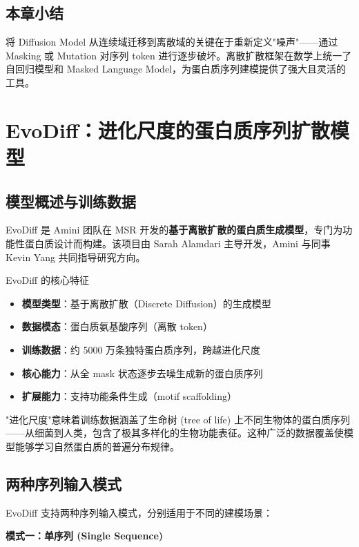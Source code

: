 \documentclass[a4paper]{article}
\begin{document}
\subsection{本章小结}

将 Diffusion Model 从连续域迁移到离散域的关键在于重新定义"噪声"——通过 Masking 或 Mutation 对序列 token 进行逐步破坏。离散扩散框架在数学上统一了自回归模型和 Masked Language Model，为蛋白质序列建模提供了强大且灵活的工具。


\section{EvoDiff：进化尺度的蛋白质序列扩散模型}

\subsection{模型概述与训练数据}

EvoDiff 是 Amini 团队在 MSR 开发的\textbf{基于离散扩散的蛋白质生成模型}，专门为功能性蛋白质设计而构建。该项目由 Sarah Alamdari 主导开发，Amini 与同事 Kevin Yang 共同指导研究方向。

\begin{importantbox}{EvoDiff 的核心特征}
\begin{itemize}
    \item \textbf{模型类型}：基于离散扩散（Discrete Diffusion）的生成模型
    \item \textbf{数据模态}：蛋白质氨基酸序列（离散 token）
    \item \textbf{训练数据}：约 5000 万条独特蛋白质序列，跨越进化尺度
    \item \textbf{核心能力}：从全 mask 状态逐步去噪生成新的蛋白质序列
    \item \textbf{扩展能力}：支持功能条件生成（motif scaffolding）
\end{itemize}
\end{importantbox}

"进化尺度"意味着训练数据涵盖了生命树 (tree of life) 上不同生物体的蛋白质序列——从细菌到人类，包含了极其多样化的生物功能表征。这种广泛的数据覆盖使模型能够学习自然蛋白质的普遍分布规律。

\subsection{两种序列输入模式}

EvoDiff 支持两种序列输入模式，分别适用于不同的建模场景：

\textbf{模式一：单序列 (Single Sequence)}
\end{document}
